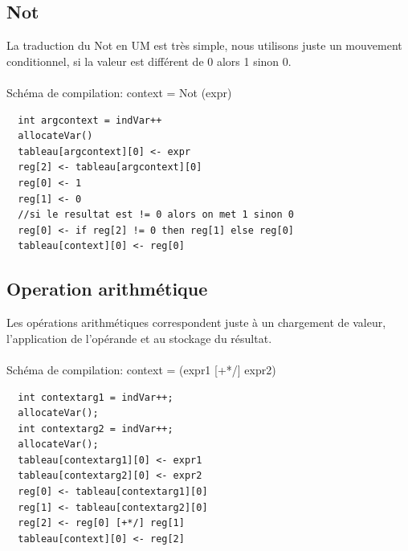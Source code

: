 \documentclass[a4paper,12pt]{report}
\begin{document}
\subsection{Not}
La traduction du Not en UM est très simple, nous utilisons juste un mouvement conditionnel, si la valeur est différent de 0 alors 1 
sinon 0.
\\ \\
Schéma de compilation: context = Not (expr)
\begin{verbatim}
  int argcontext = indVar++
  allocateVar()
  tableau[argcontext][0] <- expr
  reg[2] <- tableau[argcontext][0]
  reg[0] <- 1
  reg[1] <- 0
  //si le resultat est != 0 alors on met 1 sinon 0
  reg[0] <- if reg[2] != 0 then reg[1] else reg[0]
  tableau[context][0] <- reg[0]
\end{verbatim}

\subsection{Operation arithmétique}
Les opérations arithmétiques correspondent juste à un chargement de valeur, l'application de l'opérande et au stockage du résultat.
\\ \\
Schéma de compilation: context = (expr1 [+*/] expr2)
\begin{verbatim}
  int contextarg1 = indVar++;
  allocateVar();
  int contextarg2 = indVar++;
  allocateVar();
  tableau[contextarg1][0] <- expr1
  tableau[contextarg2][0] <- expr2
  reg[0] <- tableau[contextarg1][0]
  reg[1] <- tableau[contextarg2][0]
  reg[2] <- reg[0] [+*/] reg[1]
  tableau[context][0] <- reg[2]
\end{verbatim}
\end{document}
